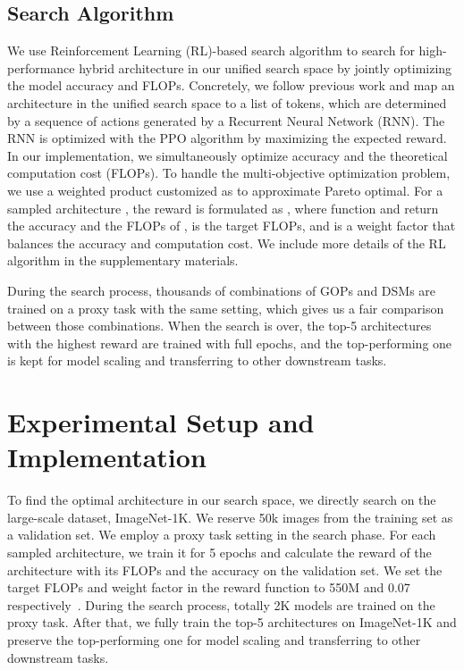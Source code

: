 \documentclass[runningheads]{llncs}
\begin{document}
\subsection{Search Algorithm}

We use Reinforcement Learning (RL)-based search algorithm to search for high-performance hybrid architecture in our unified search space by jointly optimizing the model accuracy and FLOPs. Concretely, we follow previous work \cite{fnas,mnas} and map an architecture in the unified search space to a list of tokens, which are determined by a sequence of actions generated by a Recurrent Neural Network (RNN). 
The RNN is optimized with the PPO algorithm \cite{ppo} by maximizing the expected reward. In our implementation, we simultaneously optimize accuracy and the theoretical computation cost (FLOPs). To handle the multi-objective optimization problem, we use a weighted product customized as \cite{mnas} to approximate Pareto optimal. For a sampled architecture , the reward is formulated as , where function  and  return the accuracy and the FLOPs of ,  is the target FLOPs, and  is a weight factor that balances the accuracy and computation cost. We include more details of the RL algorithm in the supplementary materials.

During the search process, thousands of combinations of GOPs and DSMs are trained on a proxy task with the same setting, which gives us a fair comparison between those combinations.  When the search is over, the top-5 architectures with the highest reward are trained with full epochs, and the top-performing one is kept for model scaling and transferring to other downstream tasks.

\section{Experimental Setup and Implementation}
To find the optimal architecture in our search space, we directly search on the large-scale dataset, ImageNet-1K. We reserve 50k images from the training set as a validation set. We employ a proxy task setting in the search phase. For each sampled architecture, we train it for 5 epochs and calculate the reward of the architecture with its FLOPs and the accuracy on the validation set. We set the target FLOPs  and weight factor  in the reward function to 550M and 0.07 respectively~\cite{efficientnet}. During the search process, totally 2K models are trained on the proxy task. After that, we fully train the top-5 architectures on ImageNet-1K and preserve the top-performing one for model scaling and transferring to other downstream tasks.
\end{document}

